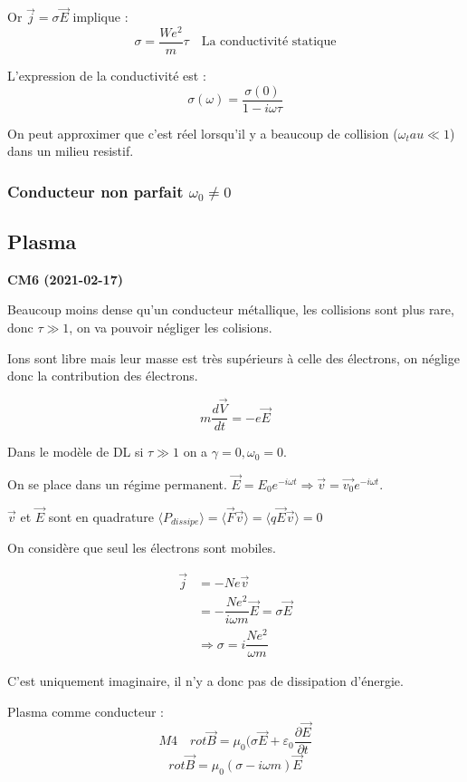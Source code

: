 \documentclass[12pt,a4paper]{report}
\begin{document}
Or \(\vec{j} = \sigma \vec{E}\) implique :
\[
	\sigma = \dfrac{We^2}{m} \tau \quad \text{La conductivité statique}
\]

L'expression de la conductivité est :
\[
	\sigma(\omega) = \dfrac{\sigma(0)}{1 - i\omega \tau}
\]

On peut approximer que c'est réel lorsqu'il y a beaucoup de collision (\(\omega _tau \ll 1\)) dans un milieu resistif.

\subsubsection{Conducteur non parfait \(\omega_0 \neq 0\)}

\subsection{Plasma}

\begin{center}
\textbf{CM6 (2021-02-17)}
\end{center}

Beaucoup moins dense qu'un conducteur métallique, les collisions sont plus rare, donc \(\tau \gg 1\), on va pouvoir négliger les colisions.

Ions sont libre mais leur masse est très supérieurs à celle des électrons, on néglige donc la contribution des électrons.

\[
	m \dfrac{d\vec{V}}{dt} = -e \vec{E}
\]

Dans le modèle de DL si \(\tau \gg 1\) on a \(\gamma = 0, \omega_0 = 0\).

On se place dans un régime permanent. \(\vec{E} = E_0 e^{-i \omega t} \Rightarrow \vec{v} = \vec{v_0} e^{-i \omega t}\).

\(\vec{v}\) et \(\vec{E}\) sont en quadrature \(\langle P_{dissipe} \rangle = \langle \vec{F} \vec{v}\rangle = \langle q \vec{E} \vec{v}\rangle = 0\)

On considère que seul les électrons sont mobiles.

\begin{align*}
	\vec{j} &= -N e \vec{v}\\
	&= -\dfrac{N e^2}{i \omega m} \vec{E} = \sigma \vec{E}\\
	&\Rightarrow \sigma = i \dfrac{Ne^2}{\omega m}
\end{align*}

C'est uniquement imaginaire, il n'y a donc pas de dissipation d'énergie.

Plasma comme conducteur :
\[
	M4 \quad rot \vec{B} = \mu_0 (\sigma \vec{E} + \varepsilon_0 \dfrac{\partial \vec{E}}{\partial t}
\]
\[
	rot \vec{B} = \mu_0 (\sigma - i \omega m) \vec{E}
\]
\end{document}
